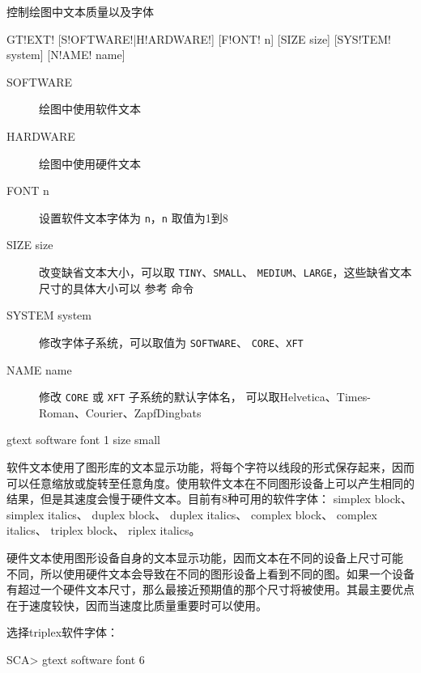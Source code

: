 \label{cmd:gtext}

控制绘图中文本质量以及字体

\begin{SACSTX}
GT!EXT! [S!OFTWARE!|H!ARDWARE!] [F!ONT! n] [SIZE size] [SYS!TEM! system]
    [N!AME! name]
\end{SACSTX}

\begin{description}
\item [SOFTWARE]  绘图中使用软件文本
\item [HARDWARE]  绘图中使用硬件文本
\item [FONT n] 设置软件文本字体为 \texttt{n}，\texttt{n} 取值为1到8
\item [SIZE size]  改变缺省文本大小，可以取 \texttt{TINY}、\texttt{SMALL}、
    \texttt{MEDIUM}、\texttt{LARGE}，这些缺省文本尺寸的具体大小可以
    参考  命令
\item [SYSTEM system] 修改字体子系统，可以取值为 \texttt{SOFTWARE}、
    \texttt{CORE}、\texttt{XFT}
\item [NAME name] 修改 \texttt{CORE} 或 \texttt{XFT} 子系统的默认字体名，
    可以取Helvetica、Times-Roman、Courier、ZapfDingbats
\end{description}

\begin{SACDFT}
gtext software font 1 size small
\end{SACDFT}

软件文本使用了图形库的文本显示功能，将每个字符以线段的形式保存起来，因而
可以任意缩放或旋转至任意角度。使用软件文本在不同图形设备上可以产生相同的
结果，但是其速度会慢于硬件文本。目前有8种可用的软件字体：
simplex block、
simplex italics、
duplex block、
duplex italics、
complex block、
complex italics、
triplex block、
riplex italics。

硬件文本使用图形设备自身的文本显示功能，因而文本在不同的设备上尺寸可能
不同，所以使用硬件文本会导致在不同的图形设备上看到不同的图。如果一个设备
有超过一个硬件文本尺寸，那么最接近预期值的那个尺寸将被使用。其最主要优点
在于速度较快，因而当速度比质量重要时可以使用。

选择triplex软件字体：
\begin{SACCode}
SCA> gtext software font 6
\end{SACCode}
